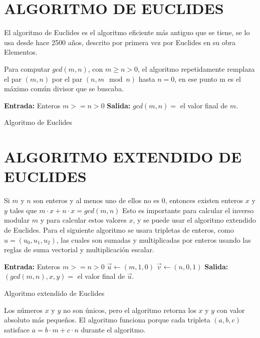     \section{ALGORITMO DE EUCLIDES}
    El algoritmo de Euclides es el algoritmo eficiente más antiguo que se tiene, se lo usa desde hace 2500 años, descrito por primera vez por Euclides en su obra Elementos.

    Para computar $gcd(m,n)$, con $m\geq n > 0$, el algoritmo repetidamente remplaza el par $(m,n)$ por el par $(n, m \mod n)$ hasta $n=0$, en ese punto m es el máximo común divisor que se buscaba.
    
    \begin{algorithm}[H]
        \SetAlgoLined
        \textbf{Entrada:} Enteros $m >= n > 0$ \;
         \textbf{Salida:} $gcd(m,n)=$ el valor final de $m$.\ 
         \caption{Algoritmo de Euclides}
    \end{algorithm}

    \section{ALGORITMO EXTENDIDO DE EUCLIDES}
    Si $m$ y $n$ son enteros y al menos uno de ellos no es $0$, entonces existen enteros $x$ y $y$ tales que $m\cdot x + n\cdot x = gcd(m, n)$
    Esto es importante para calcular el inverso modular $m$ y para calcular estos valores $x$, y se puede usar el algoritmo extendido de Euclides.
    Para el siguiente algoritmo se usara tripletas de enteros, como $u = (u_{0}, u_{1}, u_{2})$, las cuales son sumadas y multiplicadas por enteros usando las reglas de suma vectorial y multiplicación escalar.

    \begin{algorithm}[H]
        \SetAlgoLined
        \textbf{Entrada:} Enteros $m >= n > 0$ \;
        $\vec{u} \leftarrow (m,1,0)$\;
        $\vec{v} \leftarrow (n,0,1)$\;
         \textbf{Salida:} $(gcd(m,n),x,y)=$ el valor final de $\vec{u}$.\ 
         \caption{Algoritmo extendido de Euclides}
    \end{algorithm}

    Los números $x$ y $y$ no son únicos, pero el algoritmo retorna los $x$ y $y$ con valor absoluto más pequeños. El algoritmo funciona porque cada tripleta $(a,b,c)$ satisface $a = b\cdot m + c\cdot n$ durante el algoritmo.

